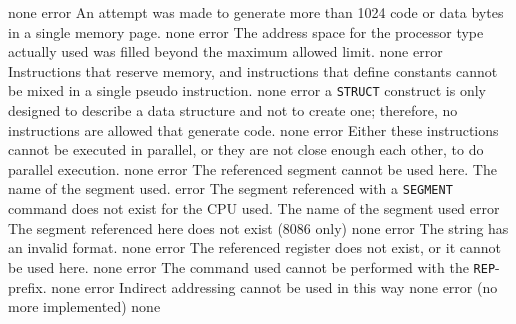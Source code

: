 \documentclass[12pt,twoside]{report}
\newcommand{\tty}[1]{{\tt #1}}
\begin{document}
\begin{description}
               {none}
               {error}
               {An attempt was made to generate more than 1024 code or
                data bytes in a single memory page.}
               {none}
               {error}
               {The address space for the processor type actually used was
                filled beyond the maximum allowed limit.}
               {none}
               {error}
               {Instructions that reserve memory, and instructions that define
                constants cannot be mixed in a single pseudo instruction.}
               {none}
               {error}
               {a \tty{STRUCT} construct is only designed to describe a
                data structure and not to create one; therefore, no
                instructions are allowed that generate code.}
               {none}
               {error}
               {Either these instructions cannot be executed in parallel,
                or they are not close enough each other, to do parallel
                execution.}
               {none}
               {error}
               {The referenced segment cannot be used here.}
               {The name of the segment used.}
               {error}
               {The segment referenced with a \tty{SEGMENT} command does not
                exist for the CPU used.}
               {The name of the segment used}
               {error}
               {The segment referenced here does not exist (8086 only)}
               {none}
               {error}
               {The string has an invalid format.}
               {none}
               {error}
               {The referenced register does not exist, or it cannot
                be used here.}
               {none}
               {error}
               {The command used cannot be performed with the \tty{REP}-prefix.}
               {none}
               {error}
               {Indirect addressing cannot be used in this way}
               {none}
               {error}
               {(no more implemented)}
               {none}

\end{description}
\end{document}
